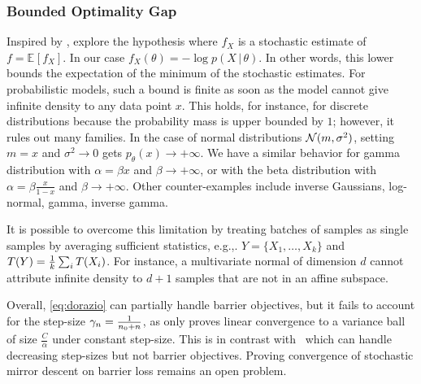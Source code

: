 \documentclass[twoside]{article}
\newcommand*{\expect}[2][]{\ensuremath{\mathbb{E}_{#1} \left[ #2 \right] }} %
\newcommand*{\expecti}[2][]{\ensuremath{\mathbb{E}_{#1} [ #2 ] }} %
\newcommand{\cond}{\,\vert\,}
\newcommand{\nat}{\theta}
\newcommand{\lr}{\gamma} %
\newcommand{\stgcvx}{\alpha} %
\begin{document}
\subsubsection{Bounded Optimality Gap}
Inspired by \citet{loizou2021stochastic}, \citet{dorazio2021stochastic} explore the hypothesis
\alignn{
\min_\nat f(\nat) - \expect[X]{\min_\nat f_X(\nat)} \leq C,
\label{eq:dorazio}
}
where $f_X$ is a stochastic estimate of $f = \expecti{f_X}$. In our case $f_X(\nat) = - \log p(X\cond \nat)$.
In other words, this lower bounds the expectation of the minimum of the stochastic estimates.
For probabilistic models, such a bound is finite as soon as the model cannot give infinite density to any data point $x$.
This holds, for instance, for discrete distributions because the probability mass is upper bounded by $1$; however, it rules out  many families.
In the case of normal distributions ${\mathcal N}(m, \sigma^2)$, setting $m=x$ and $\sigma^2 \rightarrow 0$ gets $p_\nat (x) \rightarrow +\infty$. We have a similar behavior for gamma distribution with $\alpha = \beta x$ and $\beta \rightarrow +\infty$, or with the beta distribution with $\alpha=\beta \frac{x}{1-x}$ and $\beta \rightarrow +\infty$.
 Other counter-examples include inverse Gaussians, log-normal, gamma, inverse gamma.

It is possible to overcome this limitation by treating batches of samples as single samples by averaging sufficient statistics, e.g.,. $Y = \{X_1, \dots, X_k\}$ and $T(Y) = \frac{1}{k}\sum_i T(X_i)$.
For instance, a multivariate normal of dimension $d$ cannot attribute infinite density to $d+1$ samples that are not in an affine subspace.

Overall, \eqref{eq:dorazio} can partially handle barrier objectives, but it fails to account for the step-size $\lr_n = \inv{n_0+n}$, as \citet[Thm.1]{dorazio2021stochastic} only proves linear convergence to a variance ball of size $\frac{C}{\stgcvx}$ under constant step-size.
This is in contrast with~\citet{dragomir2021fast} which can handle decreasing step-sizes but not barrier objectives.
Proving convergence of stochastic mirror descent on barrier loss remains an open problem.
\end{document}
